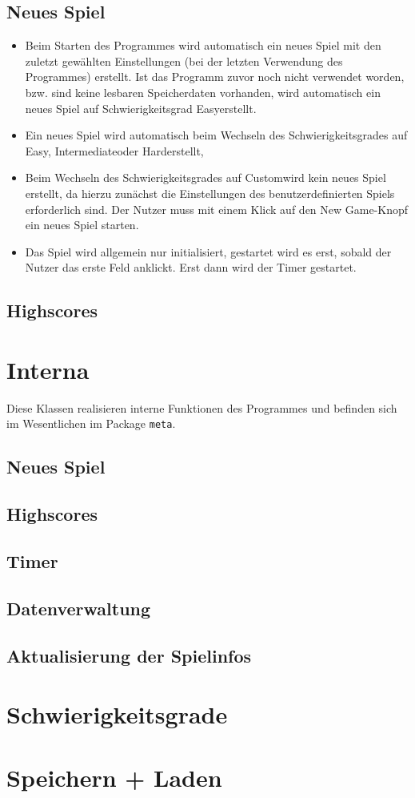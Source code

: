 \documentclass[oneside,12pt]{scrartcl}
\newcommand*{\EnableHyphenationInTexttt}{\hyphenchar\font=45\relax}%
\newcommand{\package}[1]{Package \npackage{#1}}
\newcommand{\npackage}[1]{\textcolor{Blue4}{\bcode{#1}}}
\newcommand{\bcode}[1]{\texttt{\EnableHyphenationInTexttt#1}}
\begin{document}
\subsection{Neues Spiel}
\begin{itemize}
\item Beim Starten des Programmes wird automatisch ein neues Spiel mit den zuletzt gewählten Einstellungen (bei der letzten Verwendung des Programmes) erstellt. Ist das Programm zuvor noch nicht verwendet worden, bzw. sind keine lesbaren Speicherdaten vorhanden, wird automatisch ein neues Spiel auf Schwierigkeitsgrad \glqq Easy\grqq erstellt.
\item Ein neues Spiel wird automatisch beim Wechseln des Schwierigkeitsgrades auf \glqq Easy\grqq, \glqq Intermediate\grqq oder \glqq Hard\grqq erstellt,
\item Beim Wechseln des Schwierigkeitsgrades auf \glqq Custom\grqq wird kein neues Spiel erstellt, da hierzu zunächst die Einstellungen des benutzerdefinierten Spiels erforderlich sind. Der Nutzer muss mit einem Klick auf den \glqq New Game\grqq-Knopf ein neues Spiel starten.
\item Das Spiel wird allgemein nur initialisiert, gestartet wird es erst, sobald der Nutzer das erste Feld anklickt. Erst dann wird der Timer gestartet.
\end{itemize}

\subsection{Highscores}

\section{Interna}
Diese Klassen realisieren interne Funktionen des Programmes und befinden sich im Wesentlichen im \package{meta}.

\subsection{Neues Spiel}

\subsection{Highscores}

\subsection{Timer}

\subsection{Datenverwaltung}

\subsection{Aktualisierung der Spielinfos}

\section{Schwierigkeitsgrade}
\label{sec:Schwierigkeitsgrade}

\section{Speichern + Laden}
\end{document}
